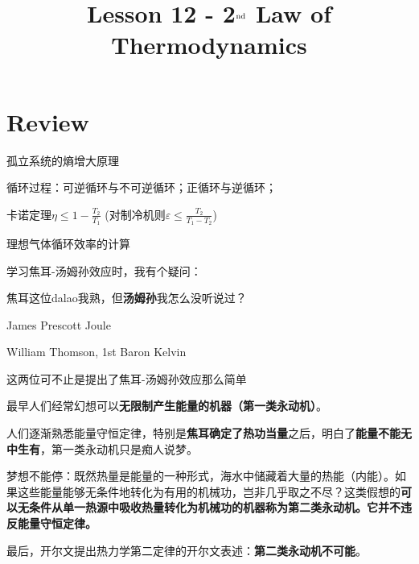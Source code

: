 \documentclass[CJK]{beamer}
\title{Lesson 12 - 2$^{\rm nd}$ Law of Thermodynamics}
\author{}
\date{}
\begin{document}

\section{Review}

\begin{frame}
\bch 
\bitem
\item{孤立系统的熵增大原理}
\item{循环过程：可逆循环与不可逆循环；正循环与逆循环；}
\item{卡诺定理$\eta \le 1 -\frac{T_2}{T_1}$ (对制冷机则$\varepsilon \le \frac{T_2}{T_1-T_2}$)}
\item{理想气体循环效率的计算}
\eitem
\ech
\end{frame}

\begin{frame}
\bch
学习焦耳-汤姆孙效应时，我有个疑问：

\skiplines

焦耳这位dalao我熟，但{\large \bf 汤姆孙}我怎么没听说过？

\ech
\end{frame}

\begin{frame}
\bch
\bitem
\item{James Prescott Joule
  
}
\item{William Thomson, 1st Baron Kelvin 

}
\eitem
这两位可不止是提出了焦耳-汤姆孙效应那么简单
\ech
\end{frame}



\begin{frame}
\bch
\bitem
\item{最早人们经常幻想可以{\bf 无限制产生能量的机器（第一类永动机）}。}
\item{人们逐渐熟悉能量守恒定律，特别是{\bf 焦耳确定了热功当量}之后，明白了{\bf 能量不能无中生有}，第一类永动机只是痴人说梦。}
\item{梦想不能停：既然热量是能量的一种形式，海水中储藏着大量的热能（内能）。如果这些能量能够无条件地转化为有用的机械功，岂非几乎取之不尽？这类假想的{\bf 可以无条件从单一热源中吸收热量转化为机械功的机器称为第二类永动机。它并不违反能量守恒定律。}}
\item{最后，开尔文提出热力学第二定律的开尔文表述：{\bf 第二类永动机不可能}。}
\eitem

\ech
\end{frame}
\end{document}

